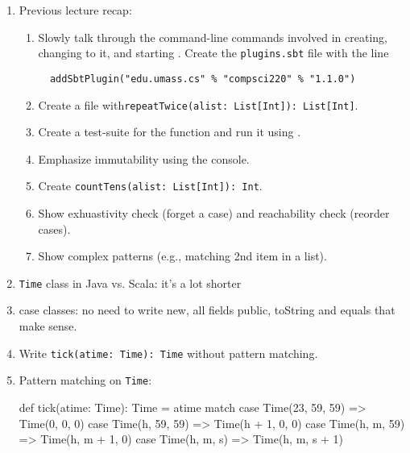 \documentclass[9pt]{extbook}
\begin{document}
\begin{enumerate}

  \item Previous lecture recap:

\begin{enumerate}

  \item Slowly talk through the command-line commands involved in
  creating, changing to it, and starting \sbt{}. Create
  the \texttt{plugins.sbt} file with the line

  \begin{lstlisting}
  addSbtPlugin("edu.umass.cs" % "compsci220" % "1.1.0")
  \end{lstlisting}

  \item Create a file with\lstinline|repeatTwice(alist: List[Int]): List[Int]|.

  \item Create a test-suite for the function and run it using \sbt{}.

  \item Emphasize immutability using the console.

  \item Create \lstinline|countTens(alist: List[Int]): Int|.

  \item Show exhuastivity check (forget a case) and reachability check (reorder cases).

  \item Show complex patterns (e.g., matching 2nd item in a list).

\end{enumerate}

  \item \lstinline|Time| class in Java vs. Scala: it's a lot shorter

  \item case classes: no need to write new, all fields public, toString and equals that make sense.

  \item Write \lstinline|tick(atime: Time): Time| without pattern matching.
  
  \item Pattern matching on \lstinline|Time|:

  \begin{scalacode}
  def tick(atime: Time): Time = atime match {
    case Time(23, 59, 59) => Time(0, 0, 0)
    case Time(h, 59, 59) => Time(h + 1, 0, 0)
    case Time(h, m, 59) => Time(h, m + 1, 0)
    case Time(h, m, s) => Time(h, m, s + 1)
  }
  \end{scalacode}


\end{enumerate}
\end{document}
